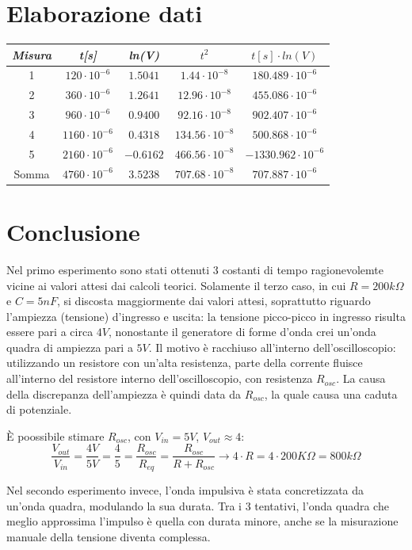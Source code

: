     \section{Elaborazione dati}
    \begin{tabular}{|c|c|c|c|c|}
        \hline
        \textit{Misura} & \textit{t[s]} & \textit{ln(V)} & \textit{$t^2$} & \textit{$t[s] \cdot ln(V)$} \\
        \hline
        1 & $120 \cdot 10^{-6}$ & $1.5041$ & $1.44 \cdot 10^{-8}$ & $180.489 \cdot 10^{-6}$ \\
        \hline
        2 & $360 \cdot 10^{-6}$ & $1.2641$ & $12.96 \cdot 10^{-8}$ & $455.086 \cdot 10^{-6}$ \\
        \hline
        3 & $960 \cdot 10^{-6}$ & $0.9400$ & $92.16 \cdot 10^{-8}$ & $902.407 \cdot 10^{-6}$ \\
        \hline
        4 & $1160 \cdot 10^{-6}$ & $0.4318$ & $134.56 \cdot 10^{-8}$ & $500.868 \cdot 10^{-6}$ \\
        \hline
        5 & $2160 \cdot 10^{-6}$ & $-0.6162$ & $466.56 \cdot 10^{-8}$ & $-1330.962 \cdot 10^{-6}$ \\
        \hline
        Somma & $4760 \cdot 10^{-6}$ & $3.5238$ & $707.68 \cdot 10^{-8}$ & $707.887 \cdot 10^{-6}$ \\
        \hline
    \end{tabular}
    
    \newpage
    \section{Conclusione}
    Nel primo esperimento sono stati ottenuti 3 costanti di tempo ragionevolemte vicine ai valori
    attesi dai calcoli teorici. Solamente il terzo caso, in cui $R = 200k\Omega$ e $C = 5nF$, si discosta maggiormente
    dai valori attesi, soprattutto riguardo l'ampiezza (tensione) d'ingresso e uscita: la tensione picco-picco
    in ingresso risulta essere pari a circa $4 V$, nonostante il generatore di forme d'onda crei un'onda quadra di ampiezza
    pari a $5V$. Il motivo è racchiuso all'interno dell'oscilloscopio: utilizzando un resistore con un'alta resistenza,
    parte della corrente fluisce all'interno del resistore interno dell'oscilloscopio, con resistenza $R_{osc}$.
    La causa della discrepanza dell'ampiezza è quindi data da $R_{osc}$, la quale causa una caduta di potenziale.\par
    È poossibile stimare $R_{osc}$, con $V_{in} = 5V$, $V_{out} \approx 4$: 
    \begin{equation}
        \frac{V_{out}}{V_{in}} = \frac{4V}{5V} = \frac{4}{5} = \frac{R_{osc}}{R_{eq}} = \frac{R_{osc}}{R + R_{osc}} \longrightarrow
        4 \cdot R = 4 \cdot 200K\Omega = 800 k\Omega
    \end{equation}
    \par
    Nel secondo esperimento invece, l'onda impulsiva è stata concretizzata da un'onda quadra, modulando la sua durata.
    Tra i 3 tentativi, l'onda quadra che meglio approssima l'impulso è quella con durata minore, anche se la misurazione manuale
    della tensione diventa complessa.
    
